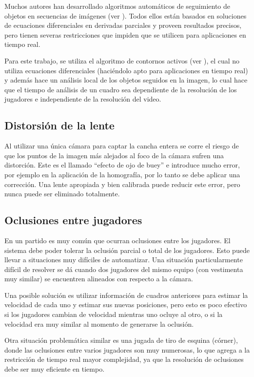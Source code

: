 Muchos autores han desarrollado algoritmos automáticos de seguimiento de
objetos en secuencias de imágenes (ver \cite{IFTrace, alp, local-learning,
MHT-2}). Todos ellos están basados en soluciones de ecuaciones diferenciales en
derivadas parciales y proveen resultados precisos, pero tienen severas
restricciones que impiden que se utilicen para aplicaciones en tiempo real.

Para este trabajo, se utiliza el algoritmo de contornos activos (ver
\cite{fast-level-set}), el cual no utiliza ecuaciones diferenciales (haciéndolo
apto para aplicaciones en tiempo real) y además hace un análisis local de los
objetos seguidos en la imagen, lo cual hace que el tiempo de análisis de un
cuadro sea dependiente de la resolución de los jugadores e independiente de la
resolución del video.

\subsection{Distorsión de la lente}

Al utilizar una única cámara para captar la cancha entera se corre el riesgo de
que los puntos de la imagen más alejados al foco de la cámara sufren una
distorción. Este es el llamado ``efecto de ojo de buey'' e introduce mucho
error, por ejemplo en la aplicación de la homografía, por lo tanto se debe
aplicar una corrección. Una lente apropiada y bien calibrada puede reducir este
error, pero nunca puede ser eliminado totalmente.


\subsection{Oclusiones entre jugadores}

En un partido es muy común que ocurran oclusiones entre los jugadores. El
sistema debe poder tolerar la oclusión parcial o total de los jugadores. Esto
puede llevar a situaciones muy difíciles de automatizar. Una situación
particularmente difícil de resolver se dá cuando dos jugadores del mismo equipo
(con vestimenta muy similar) se encuentren alineados con respecto a la cámara.

Una posible solución es utilizar información de cuadros anteriores para estimar
la velocidad de cada uno y estimar sus nuevas posiciones, pero esto es poco
efectivo si los jugadores cambian de velocidad mientras uno ocluye al otro, o
si la velocidad era muy similar al momento de generarse la oclusión.

Otra situación problemática similar es una jugada de tiro de esquina (córner),
donde las oclusiones entre varios jugadores son muy numerosas, lo que agrega a
la restricción de tiempo real mayor complejidad, ya que la resolución de
oclusiones debe ser muy eficiente en tiempo.

